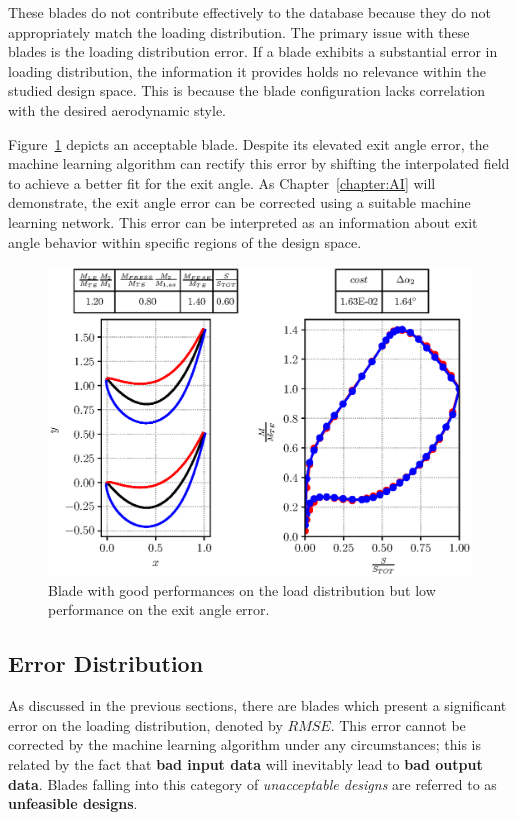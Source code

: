 These blades do not contribute effectively to the database because they do not appropriately match the loading distribution. 
The primary issue with these blades is the loading distribution error. If a blade exhibits a substantial error in loading distribution, the information it provides holds no relevance within the studied design space. 
This is because the blade configuration lacks correlation with the desired aerodynamic style.

Figure~\ref{fig:midBlade} depicts an acceptable blade. Despite its elevated exit angle error, the machine learning algorithm can rectify this error by shifting the interpolated field to achieve a better fit for the exit angle. 
As Chapter~\ref{chapter:AI} will demonstrate, the exit angle error can be corrected using a suitable machine learning network. This error can be interpreted as an information about exit angle behavior within specific regions of the design space.

\begin{figure}[H]
    \centering 
    \hspace*{-0.6cm}
    \includegraphics[scale=\scaleBlade]{./images/bladeVal0477.eps}
    \caption{Blade with good performances on the load distribution but low performance on the exit angle error.}
    \label{fig:midBlade}
\end{figure}

\subsection{Error Distribution}

As discussed in the previous sections, there are blades which present a significant error on the loading distribution, denoted by $RMSE$.
This error cannot be corrected by the machine learning algorithm under any circumstances; this is related by the 
fact that \textbf{bad input data} will inevitably lead to \textbf{bad output data}.
Blades falling into this category of \textit{unacceptable designs} are referred to as \textbf{unfeasible designs}.

